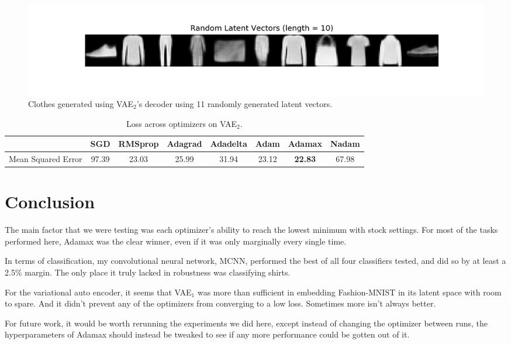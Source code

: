 \documentclass[12pt]{article}
\begin{document}
  \begin{figure}
    \centering
    \includegraphics[width=\linewidth]{task_5_clothes_kernel_5_kernels_32_latent_10_examples.png}
    \caption{Clothes generated using VAE$_2$'s decoder using 11 randomly generated latent vectors.}
    \label{fig:task_5_clothes_kernel_5_kernels_32_latent_10_examples}
  \end{figure}

  \begin{table}[]
    \centering
    \caption{Loss across optimizers on VAE$_2$.}
    \label{tab:VAE_2}
    \begin{tabular}{|c|c|c|c|c|c|c|c|}
    \hline
     & SGD & RMSprop & Adagrad & Adadelta & Adam & Adamax & Nadam \\ \hline
    Mean Squared Error & 97.39 & 23.03 & 25.99 & 31.94 & 23.12 & \textbf{22.83} & 67.98 \\ \hline
    \end{tabular}
    \end{table}

\section{Conclusion}

The main factor that we were testing was each optimizer's ability to reach the lowest minimum with stock settings.
For most of the tasks performed here, Adamax was the clear winner, even if it was only marginally every single time.

In terms of classification, my convolutional neural network, MCNN, performed the best of all four classifiers
 tested, and did so by at least a 2.5\% margin. The only place it truly lacked in robustness was classifying shirts.

For the variational auto encoder, it seems that VAE$_1$ was more than sufficient in embedding Fashion-MNIST
 in its latent space with room to spare.
And it didn't prevent any of the optimizers from converging to a low loss.
Sometimes more isn't always better.

For future work, it would be worth rerunning the experiments we did here, except instead of changing
 the optimizer between runs, the hyperparameters of Adamax should instead be tweaked to see if any more performance could be gotten out of it.
\end{document}

